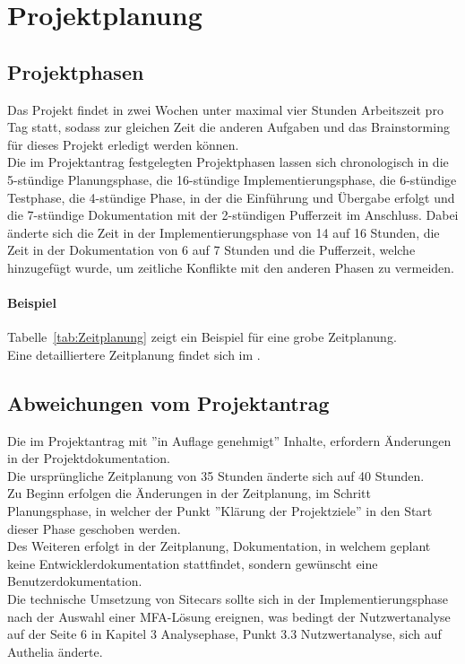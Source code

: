 \section{Projektplanung} 
\label{sec:Projektplanung}


\subsection{Projektphasen}
\label{sec:Projektphasen}

Das Projekt findet in zwei Wochen unter maximal vier Stunden Arbeitszeit pro Tag statt, sodass zur gleichen 
Zeit die anderen Aufgaben und das Brainstorming für dieses Projekt erledigt werden können.
\\Die im Projektantrag festgelegten Projektphasen lassen sich chronologisch in die 5-stündige Planungsphase, 
die 16-stündige Implementierungsphase, die 6-stündige Testphase, die 4-stündige Phase, in der die 
Einführung und Übergabe erfolgt und die 7-stündige Dokumentation mit der 2-stündigen Pufferzeit im Anschluss.
Dabei änderte sich die Zeit in der Implementierungsphase von 14 auf 16 Stunden, die Zeit in der 
Dokumentation von 6 auf 7 Stunden und die Pufferzeit, welche hinzugefügt wurde, um zeitliche Konflikte mit 
den anderen Phasen zu vermeiden.

\paragraph{Beispiel}
Tabelle~\ref{tab:Zeitplanung} zeigt ein Beispiel für eine grobe Zeitplanung.
\\
Eine detailliertere Zeitplanung findet sich im .


\subsection{Abweichungen vom Projektantrag}
\label{sec:AbweichungenProjektantrag}

Die im Projektantrag mit ''in Auflage genehmigt'' Inhalte, erfordern Änderungen in der Projektdokumentation.
\\Die ursprüngliche Zeitplanung von 35 Stunden änderte sich auf 40 Stunden.
\\Zu Beginn erfolgen die Änderungen in der Zeitplanung, im Schritt Planungsphase, in welcher der Punkt ''Klärung der 
Projektziele'' in den Start dieser Phase geschoben werden.
\\Des Weiteren erfolgt in der Zeitplanung, Dokumentation, in welchem geplant keine Entwicklerdokumentation 
stattfindet, sondern gewünscht eine Benutzerdokumentation.
\\Die technische Umsetzung von Sitecars sollte sich in der Implementierungsphase nach der Auswahl einer MFA-Lösung 
ereignen, was bedingt der Nutzwertanalyse auf der Seite 6 in Kapitel 3 Analysephase, Punkt 3.3 Nutzwertanalyse, 
sich auf Authelia änderte.


